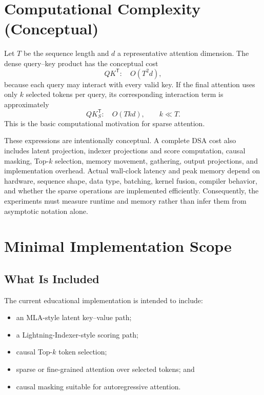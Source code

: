 \documentclass[11pt]{article}
\begin{document}
\section{Computational Complexity (Conceptual)}

Let $T$ be the sequence length and $d$ a representative attention dimension.
The dense query--key product has the conceptual cost
\begin{equation}
    QK^{\mathsf T}: \quad O(T^2d),
\end{equation}
because each query may interact with every valid key. If the final attention
uses only $k$ selected tokens per query, its corresponding interaction term is
approximately
\begin{equation}
    QK_S^{\mathsf T}: \quad O(Tkd), \qquad k\ll T.
\end{equation}
This is the basic computational motivation for sparse attention.

These expressions are intentionally conceptual. A complete DSA cost also
includes latent projection, indexer projections and score computation, causal
masking, Top-$k$ selection, memory movement, gathering, output projections,
and implementation overhead. Actual wall-clock latency and peak memory depend
on hardware, sequence shape, data type, batching, kernel fusion, compiler
behavior, and whether the sparse operations are implemented efficiently.
Consequently, the experiments must measure runtime and memory rather than infer
them from asymptotic notation alone.

\section{Minimal Implementation Scope}

\subsection{What Is Included}

The current educational implementation is intended to include:
\begin{itemize}[leftmargin=*]
    \item an MLA-style latent key--value path;
    \item a Lightning-Indexer-style scoring path;
    \item causal Top-$k$ token selection;
    \item sparse or fine-grained attention over selected tokens; and
    \item causal masking suitable for autoregressive attention.
\end{itemize}
\end{document}
